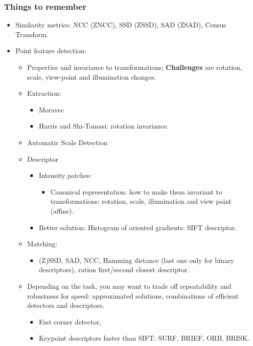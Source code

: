 \documentclass[a4paper,12 pt]{article}
\theoremstyle{definition}
\theoremstyle{remark}
\theoremstyle{definition}
\theoremstyle{definition}
\theoremstyle{definition}
\theoremstyle{remark}
\theoremstyle{definition}
\begin{document}
\subsubsection*{Things to remember}
\begin{itemize}
\item Similarity metrics: NCC (ZNCC), SSD (ZSSD), SAD (ZSAD), Census Transform.
\item Point feature detection:
\begin{itemize}
\item Properties and invariance to transformations:
\textbf{Challenges} are rotation, scale, view-point and illumination changes.
\item Extraction:
\begin{itemize}
\item Moravec
\item Harris and Shi-Tomasi: rotation invariance.
\end{itemize}
\item Automatic Scale Detection
\item Descriptor
\begin{itemize}
\item Intensity patches: 
\begin{itemize}
\item Canonical representation: how to make them invariant to transformations: rotation, scale, illumination and view point (affine).
\end{itemize}
\item Better solution: Histogram of oriented gradients: SIFT descriptor.
\end{itemize}
\item Matching:
\begin{itemize}
\item (Z)SSD, SAD, NCC, Hamming distance (last one only for binary descriptors), ration first/second closest descriptor.
\end{itemize}
\item Depending on the task, you may want to trade off repeatability and robustness for speed: approximated solutions, combinations of efficient detectors and descriptors.
\begin{itemize}
\item Fast corner detector,
\item Keypoint descriptors faster than SIFT: SURF, BRIEF, ORB, BRISK.
\end{itemize}
\end{itemize}
\end{itemize}
\end{document}
